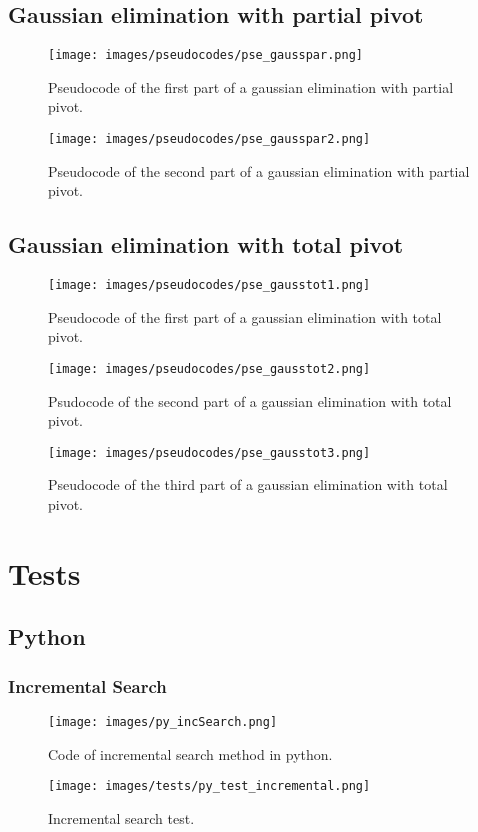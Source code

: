 \documentclass{article}
\begin{document}
\subsection{Gaussian elimination with partial pivot}
\begin{figure}[ht]
\centering
\texttt{[image: images/pseudocodes/pse\_gausspar.png]}
\caption{\label{fig:py_bisc}Pseudocode of the first part of a gaussian elimination with partial pivot.}
\end{figure}
\FloatBarrier
\begin{figure}[ht]
\centering
\texttt{[image: images/pseudocodes/pse\_gausspar2.png]}
\caption{\label{fig:py_bisc}Pseudocode of the second part of a gaussian elimination with partial pivot.}
\end{figure}
\FloatBarrier

\subsection{Gaussian elimination with total pivot}
\begin{figure}[ht]
\centering
\texttt{[image: images/pseudocodes/pse\_gausstot1.png]}
\caption{\label{fig:py_bisc}Pseudocode of the first part of a gaussian elimination with total pivot.}
\end{figure}
\FloatBarrier
\begin{figure}[ht]
\centering
\texttt{[image: images/pseudocodes/pse\_gausstot2.png]}
\caption{\label{fig:py_bisc}Psudocode of the second part of a gaussian elimination with total pivot.}
\end{figure}
\FloatBarrier
\begin{figure}[ht]
\centering
\texttt{[image: images/pseudocodes/pse\_gausstot3.png]}
\caption{\label{fig:py_bisc}Pseudocode of the third part of a gaussian elimination with total pivot.}
\end{figure}
\FloatBarrier

\section{Tests}

\subsection{Python}

\subsubsection{Incremental Search}
\begin{figure}[ht]
\centering
\texttt{[image: images/py\_incSearch.png]}
\caption{\label{fig:py_bisc}Code of incremental search method in python.}
\end{figure}
\FloatBarrier
\begin{figure}[ht]
\centering
\texttt{[image: images/tests/py\_test\_incremental.png]}
\caption{\label{fig:py_bisc}Incremental search test.}
\end{figure}
\FloatBarrier
\end{document}
